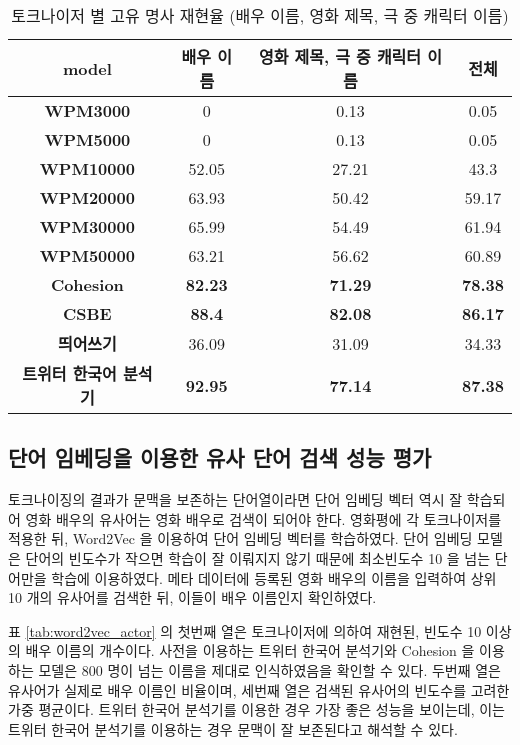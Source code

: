 \documentclass[oneside, ko,phd]{snuthesis_utf8_kor}
\begin{document}
\begin{table}[ht]
\centering
\caption{토크나이저 별 고유 명사 재현율 (배우 이름, 영화 제목, 극 중 캐릭터 이름)}
\label{tab:metamatching}
\begin{tabular}{|
>{}c |c|c|c|}
\hline
\textbf{model} & \textbf{배우 이름} & \textbf{영화 제목, 극 중 캐릭터 이름} & \textbf{전체} \\ \hline
\textbf{WPM3000} & 0 & 0.13 & 0.05 \\ \hline
\textbf{WPM5000} & 0 & 0.13 & 0.05 \\ \hline
\textbf{WPM10000} & 52.05 & 27.21 & 43.3 \\ \hline
\textbf{WPM20000} & 63.93 & 50.42 & 59.17 \\ \hline
\textbf{WPM30000} & 65.99 & 54.49 & 61.94 \\ \hline
\textbf{WPM50000} & 63.21 & 56.62 & 60.89 \\ \hline
\textbf{Cohesion} & {\textbf{82.23}} & {\textbf{71.29}} & {\textbf{78.38}} \\ \hline
\textbf{CSBE} & {\textbf{88.4}} & {\textbf{82.08}} & {\textbf{86.17}} \\ \hline
\textbf{띄어쓰기} & 36.09 & 31.09 & 34.33 \\ \hline
\textbf{트위터 한국어 분석기} & {\textbf{92.95}} & {\textbf{77.14}} & {\textbf{87.38}} \\ \hline
\end{tabular}%
\end{table}

\subsection{단어 임베딩을 이용한 유사 단어 검색 성능 평가}
토크나이징의 결과가 문맥을 보존하는 단어열이라면 단어 임베딩 벡터 역시 잘 학습되어 영화 배우의 유사어는 영화 배우로 검색이 되어야 한다.
영화평에 각 토크나이저를 적용한 뒤, Word2Vec \cite{mikolov2013efficient} 을 이용하여 단어 임베딩 벡터를 학습하였다.
단어 임베딩 모델은 단어의 빈도수가 작으면 학습이 잘 이뤄지지 않기 때문에 최소빈도수 10 을 넘는 단어만을 학습에 이용하였다.
메타 데이터에 등록된 영화 배우의 이름을 입력하여 상위 10 개의 유사어를 검색한 뒤, 이들이 배우 이름인지 확인하였다.

표 \ref{tab:word2vec_actor} 의 첫번째 열은 토크나이저에 의하여 재현된, 빈도수 10 이상의 배우 이름의 개수이다.
사전을 이용하는 트위터 한국어 분석기와 Cohesion 을 이용하는 모델은 800 명이 넘는 이름을 제대로 인식하였음을 확인할 수 있다.
두번째 열은 유사어가 실제로 배우 이름인 비율이며, 세번째 열은 검색된 유사어의 빈도수를 고려한 가중 평균이다.
트위터 한국어 분석기를 이용한 경우 가장 좋은 성능을 보이는데, 이는 트위터 한국어 분석기를 이용하는 경우 문맥이 잘 보존된다고 해석할 수 있다.
\end{document}
